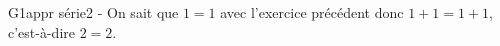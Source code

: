   G1appr série2 - On sait que $1=1$ avec l’exercice précédent donc $1+1=1+1$,
  c’est-à-dire $2=2$.
